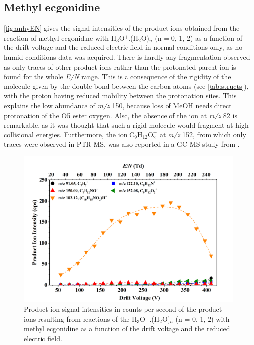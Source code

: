\subsection{Methyl ecgonidine}



\autoref{fig:anhyEN} gives the signal intensities of the product ions obtained from the reaction of methyl ecgonidine with H$_3$O$^+$.(H$_2$O)$_n$ (n = 0, 1, 2) as a function of the drift voltage and the reduced electric field in normal conditions only, as no humid conditions data was acquired.
%
There is hardly any fragmentation observed as only traces of other product ions rather than the protonated parent ion is found for the whole \textit{E/N} range.
%
This is a consequence of the rigidity of the molecule given by the double bond between the carbon atoms (see \autoref{tab:structs}), with the proton having reduced mobility between the protonation sites.
%
This explains the low abundance of \textit{m/z} 150, because loss of MeOH needs direct protonation of the O5 ester oxygen.
%
Also, the absence of the ion at \textit{m/z} 82 is remarkable, as it was thought that such a rigid molecule would fragment at high collisional energies.
%
Furthermore, the ion C$_9$H$_{12}$O$_2^+$ at \textit{m/z} 152, from which only traces were observed in PTR-MS, was also reported in a GC-MS study from \citeauthor{paul2005concentration} 
\cite{paul2005concentration}.



\begin{figure}[htbp]
\centering
\includegraphics[width=0.8\linewidth]{pics/cocaine-chapter/ame-cps.png}
\caption{Product ion signal intensities in counts per second of the product ions resulting from reactions of the H$_3$O$^+$.(H$_2$O)$_n$ (n = 0, 1, 2) with methyl ecgonidine as a function of the drift voltage and the reduced electric field.} 
\label{fig:anhyEN}
\end{figure}


